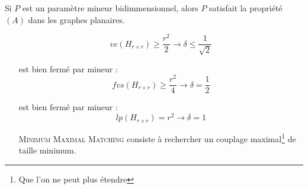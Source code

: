 \documentclass[a4paper, 11pt]{thesis}
\begin{document}
\begin{lemma}
    Si $P$ est un paramètre mineur bidimmensionnel, alors $P$ satisfait la propriété $(A)$ dans les
    graphes planaires.
\end{lemma}

\begin{ex}
    \begin{itemize}
        \item[\vcover] \[
                vc(H_{r \times r}) \geq \frac{r^2}{2} \rightarrow \delta \leq \frac{1}{\sqrt{2}}
            \]
        \item[\fvset] est bien fermé par mineur :
            \[
                fvs(H_{r \times r}) \geq \frac{r^2}{4} \rightarrow \delta = \frac{1}{2}
            \]
        \item[\lpath] est bien fermé par mineur :
            \[
                lp(H_{r \times r}) = r^2 \rightarrow \delta = 1
            \]
        \item[\textsc{Minimum Maximal Matching}] consiste à rechercher un couplage
            maximal\footnote{Que l'on ne peut plus étendre} de taille minimum.
    \end{itemize}
\end{ex}
\end{document}
